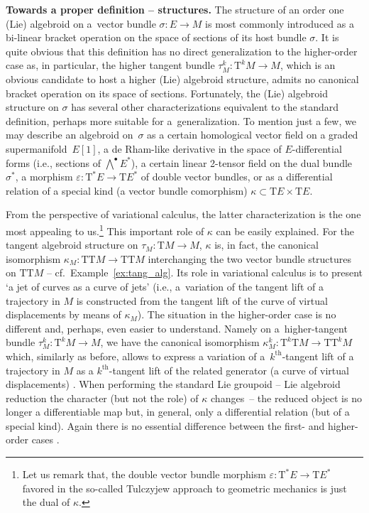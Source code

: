 \documentclass[pdftex]{sigma}
\newcommand{\Zakrzewski}{{vector bundle comorphism}}
\newcommand{\thh}[1]{#1^{\mathrm{th}}} %
\newcommand{\ra}{\rightarrow}
\newcommand{\eps}{\varepsilon}
\newcommand{\T}{\mathrm{T}} %
\newcommand{\TT}[1]{\mathrm{T}^{#1}} %
\numberwithin{equation}{section}
\theoremstyle{definition}
\begin{document}
{\bf Towards a proper definition -- structures.} The structure of an order one (Lie) algebroid on a~vector bundle $\sigma\colon E\ra M$ is most commonly introduced as a bi-linear bracket operation on the space of sections of its host bundle $\sigma$. It is quite obvious that this definition has no direct gene\-ra\-li\-zation to the higher-order case as, in particular, the higher tangent bundle \mbox{$\tau^k_M\colon \TT{k} M\ra M$}, which is an obvious candidate to host a higher (Lie) algebroid structure, admits no canonical bracket operation on its space of sections. Fortunately, the (Lie) algebroid structure on $\sigma$ has several other characterizations equivalent to the standard definition, perhaps more suitable for a~generalization. To mention just a few, we may describe an algebroid on~$\sigma$ as a certain homological vector field on a graded supermanifold~$E[1]$, a de Rham-like derivative in the space of $E$-differential forms (i.e., sections of $\bigwedge^{\bullet} E^\ast$), a certain linear 2-tensor field on the dual bundle~$\sigma^\ast$, a morphism $\eps\colon \T^\ast E\ra \T E^\ast$ of double vector bundles, or as a differential relation of a special kind (a \Zakrzewski ) $\kappa\subset\T E\times\T E$.

From the perspective of variational calculus, the latter characterization is the one most appealing to us.\footnote{Let us remark that, the double vector bundle morphism $\eps\colon \T^\ast E\ra \T E^\ast$ favored in the so-called Tulczyjew approach to geometric mechanics \cite{GG_var_calc_gen_alg_2008, GGU_geom_mech_alg_2006} is just the dual of $\kappa$.} This important role of $\kappa$ can be easily explained. For the tangent algebroid structure on $\tau_M\colon \T M\ra M$, $\kappa$ is, in fact, the canonical isomorphism $\kappa_M\colon \T\T M\ra \T\T M$ interchanging the two vector bundle structures on $\T\T M$ -- cf.\ Example~\ref{ex:tang_alg}. Its role in variational calculus is to present `a jet of curves as a curve of jets' (i.e., a~variation of the tangent lift of a trajectory in $M$ is constructed from the tangent lift of the curve of virtual displacements by means of $\kappa_M$). The situation in the higher-order case is no different and, perhaps, even easier to understand. Namely on a~higher-tangent bundle $\tau_M^k\colon \TT{k} M\ra M$, we have the canonical isomorphism $\kappa^k_M\colon \TT{k} \T M\ra \T\TT{k} M$ which, similarly as before, allows to express a variation of a~$\thh{k}$-tangent lift of a trajectory in $M$ as a $\thh{k}$-tangent lift of the related generator (a curve of virtual displacements) \cite{MJ_MR_higher_var_calc_2013}. When performing the standard Lie groupoid -- Lie algebroid reduction the character (but not the role) of $\kappa$ changes~-- the reduced object is no longer a differentiable map but, in general, only a differential relation (but of a special kind). Again there is no essential difference between the first- and higher-order cases \cite{MJ_MR_models_high_alg_2015}.
\end{document}
